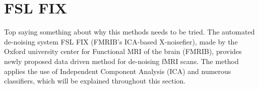 
\section{FSL FIX}

Top saying something about why this methods needs to be tried. 
The automated de-noising system FSL FIX (FMRIB's ICA-based X-noisefier), made by the Oxford university center for Functional MRI of the brain (FMRIB), provides newly proposed data driven method for de-noising fMRI scans. The method applies the use of Independent Component Analysis (ICA) and numerous classifiers, which will be explained throughout this section.\cite{Salimi-Khorshidi2014}



 